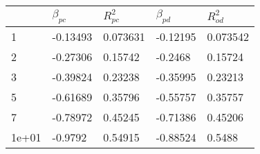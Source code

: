 \begin{tabular}{lllll}
& $\beta_{pc}$ & $R^2_{pc}$ & $\beta_{pd}$ & $R^2_{od}$ \\ 
\hline 
1 & -0.13493 & 0.073631 & -0.12195 & 0.073542 \\ 
2 & -0.27306 & 0.15742 & -0.2468 & 0.15724 \\ 
3 & -0.39824 & 0.23238 & -0.35995 & 0.23213 \\ 
5 & -0.61689 & 0.35796 & -0.55757 & 0.35757 \\ 
7 & -0.78972 & 0.45245 & -0.71386 & 0.45206 \\ 
1e+01 & -0.9792 & 0.54915 & -0.88524 & 0.5488 \\ 
\hline 
\end{tabular}